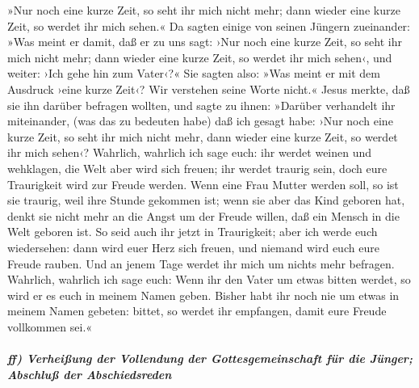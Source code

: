  »Nur noch eine kurze Zeit, so seht ihr mich nicht mehr;
dann wieder eine kurze Zeit, so werdet ihr mich sehen.« 
Da sagten einige von seinen Jüngern zueinander: »Was meint er damit, daß
er zu uns sagt: ›Nur noch eine kurze Zeit, so seht ihr mich nicht mehr;
dann wieder eine kurze Zeit, so werdet ihr mich sehen‹, und weiter: ›Ich
gehe hin zum Vater‹?«  Sie sagten also: »Was meint er mit
dem Ausdruck ›eine kurze Zeit‹? Wir verstehen seine Worte nicht.«
 Jesus merkte, daß sie ihn darüber befragen wollten, und
sagte zu ihnen: »Darüber verhandelt ihr miteinander, (was das zu
bedeuten habe) daß ich gesagt habe: ›Nur noch eine kurze Zeit, so seht
ihr mich nicht mehr, dann wieder eine kurze Zeit, so werdet ihr mich
sehen‹?  Wahrlich, wahrlich ich sage euch: ihr werdet
weinen und wehklagen, die Welt aber wird sich freuen; ihr werdet traurig
sein, doch eure Traurigkeit wird zur Freude werden.  Wenn
eine Frau Mutter werden soll, so ist sie traurig, weil ihre Stunde
gekommen ist; wenn sie aber das Kind geboren hat, denkt sie nicht mehr
an die Angst um der Freude willen, daß ein Mensch in die Welt geboren
ist.  So seid auch ihr jetzt in Traurigkeit; aber ich
werde euch wiedersehen: dann wird euer Herz sich freuen, und niemand
wird euch eure Freude rauben.  Und an jenem Tage werdet
ihr mich um nichts mehr befragen. Wahrlich, wahrlich ich sage euch: Wenn
ihr den Vater um etwas bitten werdet, so wird er es euch in meinem Namen
geben.  Bisher habt ihr noch nie um etwas in meinem Namen
gebeten: bittet, so werdet ihr empfangen, damit eure Freude vollkommen
sei.«

\hypertarget{ff-verheiuxdfung-der-vollendung-der-gottesgemeinschaft-fuxfcr-die-juxfcnger-abschluuxdf-der-abschiedsreden}{%
\subparagraph{ff) Verheißung der Vollendung der Gottesgemeinschaft für
die Jünger; Abschluß der
Abschiedsreden}\label{ff-verheiuxdfung-der-vollendung-der-gottesgemeinschaft-fuxfcr-die-juxfcnger-abschluuxdf-der-abschiedsreden}}

